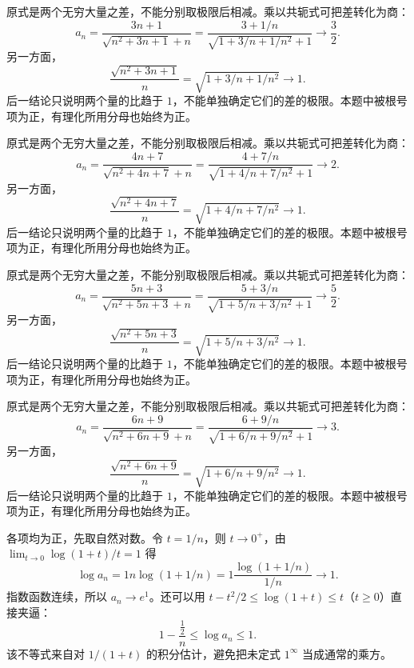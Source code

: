 \documentclass[12pt,fontset=fandol]{ctexart}
\begin{document}
\begin{solve}\label{ans:c1q9}
原式是两个无穷大量之差，不能分别取极限后相减。乘以共轭式可把差转化为商：
\[
a_n=\frac{3n+1}{\sqrt{n^2+3n+1}+n}=\frac{3+1/n}{\sqrt{1+3/n+1/n^2}+1}\longrightarrow \frac{3}{2}.
\]
另一方面，
\[
\frac{\sqrt{n^2+3n+1}}n=\sqrt{1+3/n+1/n^2}\longrightarrow1.
\]
后一结论只说明两个量的比趋于 $1$，不能单独确定它们的差的极限。本题中被根号项为正，有理化所用分母也始终为正。
\end{solve}

\begin{solve}\label{ans:c1q10}
原式是两个无穷大量之差，不能分别取极限后相减。乘以共轭式可把差转化为商：
\[
a_n=\frac{4n+7}{\sqrt{n^2+4n+7}+n}=\frac{4+7/n}{\sqrt{1+4/n+7/n^2}+1}\longrightarrow 2.
\]
另一方面，
\[
\frac{\sqrt{n^2+4n+7}}n=\sqrt{1+4/n+7/n^2}\longrightarrow1.
\]
后一结论只说明两个量的比趋于 $1$，不能单独确定它们的差的极限。本题中被根号项为正，有理化所用分母也始终为正。
\end{solve}

\begin{solve}\label{ans:c1q11}
原式是两个无穷大量之差，不能分别取极限后相减。乘以共轭式可把差转化为商：
\[
a_n=\frac{5n+3}{\sqrt{n^2+5n+3}+n}=\frac{5+3/n}{\sqrt{1+5/n+3/n^2}+1}\longrightarrow \frac{5}{2}.
\]
另一方面，
\[
\frac{\sqrt{n^2+5n+3}}n=\sqrt{1+5/n+3/n^2}\longrightarrow1.
\]
后一结论只说明两个量的比趋于 $1$，不能单独确定它们的差的极限。本题中被根号项为正，有理化所用分母也始终为正。
\end{solve}

\begin{solve}\label{ans:c1q12}
原式是两个无穷大量之差，不能分别取极限后相减。乘以共轭式可把差转化为商：
\[
a_n=\frac{6n+9}{\sqrt{n^2+6n+9}+n}=\frac{6+9/n}{\sqrt{1+6/n+9/n^2}+1}\longrightarrow 3.
\]
另一方面，
\[
\frac{\sqrt{n^2+6n+9}}n=\sqrt{1+6/n+9/n^2}\longrightarrow1.
\]
后一结论只说明两个量的比趋于 $1$，不能单独确定它们的差的极限。本题中被根号项为正，有理化所用分母也始终为正。
\end{solve}

\begin{solve}\label{ans:c1q13}
各项均为正，先取自然对数。令 $t=1/n$，则 $t\to0^+$，由 $\lim_{t\to0}\log(1+t)/t=1$ 得
\[
\log a_n=1n\log(1+1/n)=1\frac{\log(1+1/n)}{1/n}\longrightarrow 1.
\]
指数函数连续，所以 $a_n\to e^{1}$。还可以用 $t-t^2/2\le\log(1+t)\le t$（$t\ge0$）直接夹逼：
\[
1-\frac{\frac{1}{2}}n\le\log a_n\le 1.
\]
该不等式来自对 $1/(1+t)$ 的积分估计，避免把未定式 $1^\infty$ 当成通常的乘方。
\end{solve}
\end{document}
